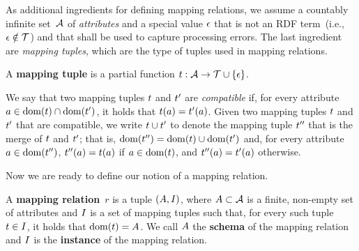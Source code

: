 As additional ingredients for defining mapping relations, we assume a countably infinite set~$\mathcal{A}$ of \emph{attributes} and a special value $\epsilon$
that is not an RDF term~(i.e., $\epsilon \notin \mathcal{T}$) and that shall be used to capture processing errors. The last ingredient
are  \emph{mapping tuples}, which are the type of tuples used in mapping relations.

\begin{definition}
	\normalfont
	A \textbf{mapping tuple} is a partial function $t:
		\mathcal{A} \rightarrow \mathcal{T} \cup \{\epsilon\}$.
\end{definition}

We say that two
mapping tuples $t$ and $t'$ are \emph{compatible} if, for every attribute $a \in \mathrm{dom}(t) \cap \mathrm{dom}(t')$, it holds that $t(a) = t'(a)$.
Given two mapping tuples $t$ and $t'$ that are compatible, we write $t \cup t'$ to denote the mapping tuple $t''$ that is the merge of $t$ and $t'$; that is, $\mathrm{dom}(t'') = \mathrm{dom}(t) \cup \mathrm{dom}(t')$ and, for every attribute~$a \in \mathrm{dom}(t'')$,
%
$t''(a) = t(a)$ if $a \in \mathrm{dom}(t)$, and $t''(a) = t'(a)$ otherwise.

Now we are ready to define our notion of a mapping relation.

\begin{definition}
	\label{def:mapping_relation}
	\normalfont
	A \textbf{mapping relation}~$r$ is a tuple $(A, I)$, where
	$A \subset \mathcal{A}$ is a finite, non-empty set of attributes
	and
	$I$ is a set of mapping tuples such
	that, for every such tuple~$t \in I$, it holds that $\mathrm{dom}(t) = A$.
	We call $A$ the \textbf{schema} of the mapping relation
	and $I$ is the \textbf{instance} of the mapping relation.
\end{definition}

